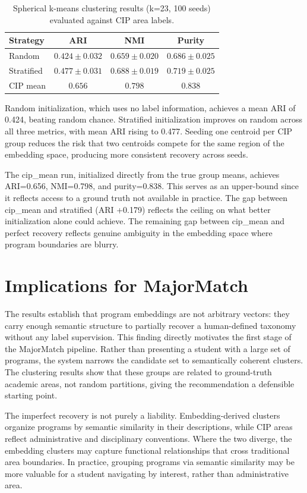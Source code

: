 \begin{table}[h]
\centering
\begin{tabular}{lccc}
\hline
\textbf{Strategy} & \textbf{ARI} & \textbf{NMI} & \textbf{Purity} \\
\hline
Random     & $0.424 \pm 0.032$ & $0.659 \pm 0.020$ & $0.686 \pm 0.025$ \\
Stratified & $0.477 \pm 0.031$ & $0.688 \pm 0.019$ & $0.719 \pm 0.025$ \\
CIP mean   & $0.656$           & $0.798$           & $0.838$           \\
\hline
\end{tabular}
\caption{Spherical k-means clustering results (k=23, 100 seeds) evaluated against CIP area labels.}
\label{tab:clustering}
\end{table}

Random initialization, which uses no label information, achieves a mean ARI of 0.424, beating random chance. Stratified initialization improves on random across all three metrics, with mean ARI rising to 0.477. Seeding one centroid per CIP group reduces the risk that two centroids compete for the same region of the embedding space, producing more consistent recovery across seeds.

The cip\_mean run, initialized directly from the true group means, achieves ARI=0.656, NMI=0.798, and purity=0.838. This serves as an upper-bound since it reflects access to a ground truth not available in practice. The gap between cip\_mean and stratified (ARI +0.179) reflects the ceiling on what better initialization alone could achieve. The remaining gap between cip\_mean and perfect recovery reflects genuine ambiguity in the embedding space where program boundaries are blurry.

\section{Implications for MajorMatch}

The results establish that program embeddings are not arbitrary vectors: they carry enough semantic structure to partially recover a human-defined taxonomy without any label supervision. This finding directly motivates the first stage of the MajorMatch pipeline. Rather than presenting a student with a large set of programs, the system narrows the candidate set to semantically coherent clusters. The clustering results show that these groups are related to ground-truth academic areas, not random partitions, giving the recommendation a defensible starting point.

The imperfect recovery is not purely a liability. Embedding-derived clusters organize programs by semantic similarity in their descriptions, while CIP areas reflect administrative and disciplinary conventions. Where the two diverge, the embedding clusters may capture functional relationships that cross traditional area boundaries. In practice, grouping programs via semantic similarity may be more valuable for a student navigating by interest, rather than administrative area.

\newpage

